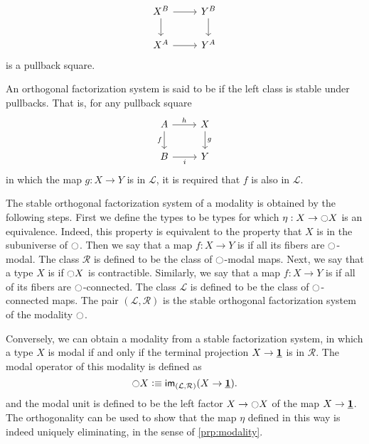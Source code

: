 \documentclass[9pt,twosided]{amsart}
\begin{document}
\begin{defn}
\begin{enumerate}
    \begin{equation*}
      \begin{tikzcd}
        X^B \arrow[r] \arrow[d] & Y^B \arrow[d] \\
        X^A \arrow[r] & Y^A
      \end{tikzcd}
    \end{equation*}
    is a pullback square.
  \end{enumerate}
  An orthogonal factorization system is said to be  if the left class is stable under pullbacks. That is, for any pullback square
  \begin{equation*}
    \begin{tikzcd}
      A \arrow[r,"h"] \arrow[d,swap,"f"] & X \arrow[d,"g"] \\
      B \arrow[r,swap,"i"] & Y
    \end{tikzcd}
  \end{equation*}
  in which the map $g:X \to Y$ is in $\mathcal{L}$, it is required that $f$ is also in $\mathcal{L}$.
\end{defn}

The stable orthogonal factorization system of a modality is obtained by the following steps. First we define the  types to be types for which $\eta:X\to{\ensuremath{\ocircle}} X$ is an equivalence. Indeed, this property is equivalent to the property that $X$ is in the subuniverse of ${\ocircle}$. Then we say that a map $f:X\to Y$ is  if all its fibers are ${\ocircle}$-modal. The class $\mathcal{R}$ is defined to be the class of ${\ocircle}$-modal maps. Next, we say that a type $X$ is  if ${\ocircle} X$ is contractible. Similarly, we say that a map $f:X\to Y$ is  if all of its fibers are ${\ocircle}$-connected. The class $\mathcal{L}$ is defined to be the class of ${\ocircle}$-connected maps. The pair $(\mathcal{L},\mathcal{R})$ is the stable orthogonal factorization system of the modality ${\ocircle}$.

Conversely, we can obtain a modality from a stable factorization system, in which a type $X$ is modal if and only if the terminal projection $X\to \underline{\mathbf{1}}$ is in $\mathcal{R}$. The modal operator of this modality is defined as
\begin{equation*}
{\ensuremath{\ocircle}} X \vcentcolon\equiv \mathsf{im}_{(\mathcal{L},\mathcal{R})}(X\to \underline{\mathbf{1}}).
\end{equation*}
and the modal unit is defined to be the left factor $X \to {\ensuremath{\ocircle}} X$ of the map $X\to \underline{\mathbf{1}}$. The orthogonality can be used to show that the map $\eta$ defined in this way is indeed uniquely eliminating, in the sense of \cref{prp:modality}.
\end{document}
